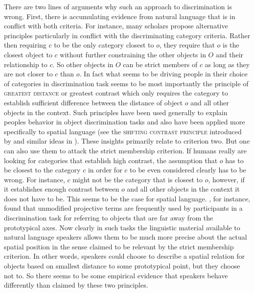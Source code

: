 There are two lines of arguments why such an approach to discrimination
is wrong. First, there is accumulating evidence from natural language that
is in conflict with both criteria. For instance, many scholars propose
alternative principles particularly in conflict with the discriminating 
category criteria. Rather then requiring $c$ to be the only category 
closest to $o$, they require that $o$ is the closest object to $c$ 
without further constraining the other objects in $O$ and their relationship
to $c$. So other objects in $O$ can be strict members of $c$ as long as they
are not closer to $c$ than $o$. In fact what seems to be driving
people in their choice of categories in discrimination task seems to be most
importantly the principle of \textsc{greatest distance} or greatest 
contrast  
which only requires the category to establish sufficient difference
between the distance of object $o$ and all other objects in the context.
Such principles have been used generally to explain peoples behavior in 
object discrimination tasks \citep{hermann1976objektbenennung}
and also have been applied more specifically to spatial language 
(see the \textsc{shifting contrast principle} introduced by 
\citealp{herskovits1986language} and similar ideas in \citealp{freksa1999links}).
These insights primarily relate to criterion two. But one can also use them 
to attack the strict membership criterion. If humans really
are looking for categories that establish high contrast, the assumption
that $o$ has to be closest to the category $c$ in order for $c$ to be
even considered clearly has to be wrong. For instance, $c$ might not
be the category that is closest to $o$, however, if it establishes enough 
contrast between $o$ and all other objects in the context it does not 
have to be. This seems to be the case for spatial language. 
\cite{tenbrink2005identifying}, for instance, found that unmodified 
projective terms are frequently used by participants in a discrimination task
for referring to objects that are far away from the prototypical axes. Now clearly
in such tasks the linguistic material available to natural language speakers 
allows them to be much more precise about the actual spatial position
in the sense claimed to be relevant by the strict membership criterion.
In other words, speakers could choose to describe a spatial relation 
for objects based on smallest distance to some prototypical point, but they
choose not to. So there seems to be some empirical evidence that
speakers behave differently than claimed by these two principles.

